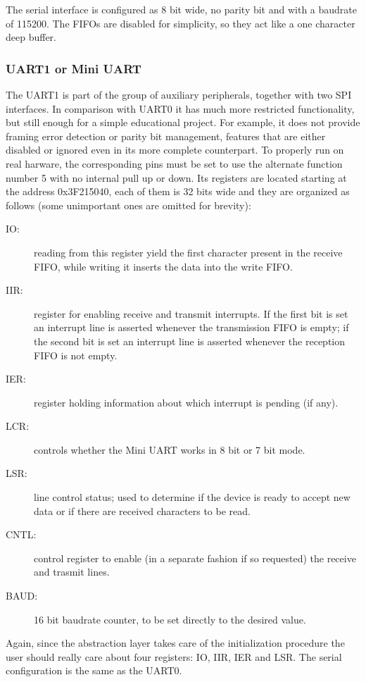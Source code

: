 \documentclass[12pt,a4paper,openright,twoside]{report}
\begin{document}
The serial interface is configured as 8 bit wide, no parity bit and with
a baudrate of 115200. The FIFOs are disabled for simplicity, so they act like 
a one character deep buffer.

\subsubsection{UART1 or Mini UART}
The UART1 is part of the group of auxiliary peripherals, together with two SPI
interfaces. In comparison with UART0 it has much more restricted functionality,
but still enough for a simple educational project. For example, it does not 
provide framing error detection or parity bit management, features that are either
disabled or ignored even in its more complete counterpart.
To properly run on real harware, the corresponding pins must be set to use the
alternate function number 5 with no internal pull up or down.
Its registers are located starting at the address 0x3F215040, each of them is 32 bits
wide and they are organized as follows (some unimportant ones are omitted for brevity):

\begin{description}
    \item[IO:] reading from this register yield the first character present in the
            receive FIFO, while writing it inserts the data into the write FIFO.
    \item[IIR:] register for enabling receive and transmit interrupts. If the first
            bit is set an interrupt line is asserted whenever the transmission FIFO
            is empty; if the second bit is set an interrupt line is asserted whenever
            the reception FIFO is not empty.
    \item[IER:] register holding information about which interrupt is pending (if any).
    \item[LCR:] controls whether the Mini UART works in 8 bit or 7 bit mode.
    \item[LSR:] line control status; used to determine if the device is ready to 
            accept new data or if there are received characters to be read.
    \item[CNTL:] control register to enable (in a separate fashion if so requested)
            the receive and trasmit lines.
    \item[BAUD:] 16 bit baudrate counter, to be set directly to the desired value.
\end{description}
Again, since the abstraction layer takes care of the initialization procedure
the user should really care about four registers: IO, IIR, IER and LSR.
The serial configuration is the same as the UART0.
\end{document}
